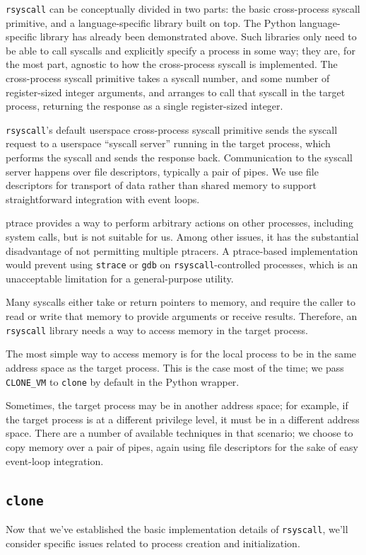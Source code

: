 \documentclass[letterpaper,twocolumn,10pt]{article}
\begin{document}
\texttt{rsyscall} can be conceptually divided in two parts:
the basic cross-process syscall primitive,
and a language-specific library built on top.
The Python language-specific library has already been demonstrated above.
Such libraries only need to be able to call syscalls and explicitly specify a process in some way;
they are, for the most part, agnostic to how the cross-process syscall is implemented.
The cross-process syscall primitive takes a syscall number, and some number of register-sized integer arguments,
and arranges to call that syscall in the target process,
returning the response as a single register-sized integer.

\texttt{rsyscall}'s default userspace cross-process syscall primitive sends the syscall request
to a userspace ``syscall server'' running in the target process,
which performs the syscall and sends the response back.
Communication to the syscall server happens over file descriptors,
typically a pair of pipes.
We use file descriptors for transport of data rather than shared memory
to support straightforward integration with event loops.

ptrace provides a way to perform arbitrary actions on other processes,
including system calls,
but is not suitable for us.
Among other issues, it has the substantial disadvantage of not permitting multiple ptracers.
A ptrace-based implementation would prevent using \texttt{strace} or \texttt{gdb} on \texttt{rsyscall}-controlled processes,
which is an unacceptable limitation for a general-purpose utility.

Many syscalls either take or return pointers to memory,
and require the caller to read or write that memory to provide arguments or receive results.
Therefore, an \texttt{rsyscall} library needs a way to access memory in the target process.

The most simple way to access memory is for the local process to be in the same address space as the target process.
This is the case most of the time; we pass \verb|CLONE_VM| to \texttt{clone} by default in the Python wrapper.

Sometimes, the target process may be in another address space;
for example, if the target process is at a different privilege level,
it must be in a different address space.
There are a number of available techniques in that scenario;
we choose to copy memory over a pair of pipes,
again using file descriptors for the sake of easy event-loop integration.
\subsection{\texttt{clone}}\label{clone}
Now that we've established the basic implementation details of \texttt{rsyscall},
we'll consider specific issues related to process creation and initialization.
\end{document}
